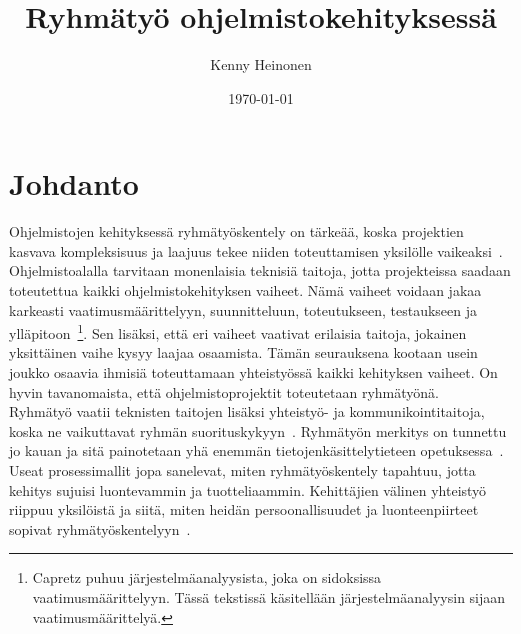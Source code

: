 \documentclass[finnish]{../tktltiki2}
\title{Ryhmätyö ohjelmistokehityksessä}
\author{Kenny Heinonen}
\date{\today}
\theoremstyle{definition}
\theoremstyle{remark}
\begin{document}

\maketitle        %
\makeabstract     %

\tableofcontents  %
\thispagestyle{empty}
\newpage          %



\section{Johdanto}

Ohjelmistojen kehityksessä ryhmätyöskentely on tärkeää, koska projektien
kasvava kompleksisuus ja laajuus tekee niiden toteuttamisen yksilölle
vaikeaksi~\cite{Jun:2010}.
Ohjelmistoalalla tarvitaan monenlaisia teknisiä taitoja, jotta projekteissa saadaan toteutettua kaikki ohjelmistokehityksen vaiheet. Nämä vaiheet voidaan jakaa karkeasti 
vaatimusmäärittelyyn, suunnitteluun, toteutukseen, testaukseen ja 
ylläpitoon~\cite{Capretz:2010:MSS:1726559.1726574}\footnote{Capretz puhuu järjestelmäanalyysista, joka on sidoksissa vaatimusmäärittelyyn. Tässä tekstissä käsitellään järjestelmäanalyysin sijaan vaatimusmäärittelyä.}. Sen lisäksi, että 
eri vaiheet vaativat erilaisia taitoja, jokainen yksittäinen vaihe kysyy laajaa 
osaamista. Tämän seurauksena kootaan usein joukko osaavia ihmisiä 
toteuttamaan yhteistyössä kaikki kehityksen vaiheet. On hyvin 
tavanomaista, että ohjelmistoprojektit toteutetaan ryhmätyönä.\\

Ryhmätyö vaatii teknisten taitojen lisäksi yhteistyö- ja kommunikointitaitoja, koska
ne vaikuttavat ryhmän suorituskykyyn~\cite{Hall:2007:CNT:1235000.1235043}. Ryhmätyön merkitys on
tunnettu jo kauan ja sitä painotetaan yhä enemmän tietojenkäsittelytieteen opetuksessa~\cite{Cushing:2003:TBP:948785.948797,Jun:2010,1158709,Pieterse:2012:PPS:2157136.2157218}.
Useat prosessimallit jopa sanelevat, miten ryhmätyöskentely tapahtuu, jotta kehitys sujuisi luontevammin ja tuotteliaammin.
Kehittäjien välinen yhteistyö riippuu yksilöistä ja siitä, miten heidän persoonallisuudet ja
luonteenpiirteet sopivat ryhmätyöskentelyyn~\cite{Acuna:2008:ESP:1414004.1414056,Hall:2007:CNT:1235000.1235043}.\\
\end{document}
